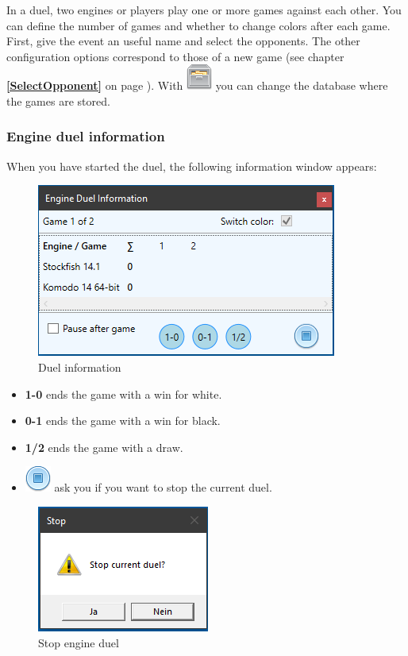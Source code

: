\documentclass[11pt,a4paper]{article}
\begin{document}
In a duel, two engines or players play one or more games against each other. You can define the number of games and whether to change colors after each game. First, give the event an useful name and select the opponents. The other configuration options correspond to those of a new game (see chapter \textbf{\ref{SelectOpponent}  } on page \pageref{SelectOpponent}).
With \includegraphics[scale=0.5]{file_manager.png} you can change the database where the games are stored.

\subsubsection{Engine duel information}
When you have started the duel, the following information window appears:

\begin{figure}[H]
	\centering
	\includegraphics[scale=1.0]{EngineDuel3.png}
	\caption{Duel information}
	\label{fig:EngineDuel3}
\end{figure}


\begin{itemize}
	\item \textbf{1-0} ends the game with a win for white.
	\item \textbf{0-1} ends the game with a win for black.
    \item \textbf{1/2} ends the game with a draw.
	\item \includegraphics[scale=0.5]{control_stop_blue.png} ask you if you want to stop the current duel.
\end{itemize}


\begin{figure}[H]
	\centering
	\includegraphics[scale=1.0]{EngineDuel4.png}
	\caption{Stop engine duel}
	\label{fig:EngineDuel4}
\end{figure}
\end{document}
